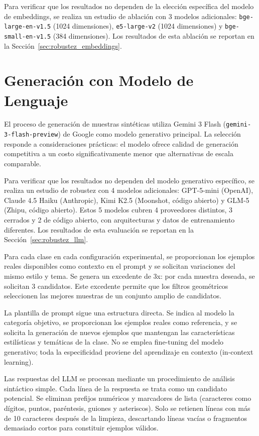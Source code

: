 Para verificar que los resultados no dependen de la elección específica del modelo de embeddings, se realiza un estudio de ablación con 3 modelos adicionales: \texttt{bge\hyp{}large\hyp{}en\hyp{}v1.5} (1024 dimensiones), \texttt{e5\hyp{}large\hyp{}v2} (1024 dimensiones) y \texttt{bge\hyp{}small\hyp{}en\hyp{}v1.5} (384 dimensiones). Los resultados de esta ablación se reportan en la Sección~\ref{sec:robustez_embeddings}.

\section{Generación con Modelo de Lenguaje}
\label{sec:generacion_llm}

El proceso de generación de muestras sintéticas utiliza Gemini 3 Flash (\texttt{gemini\hyp{}3\hyp{}flash\hyp{}preview}) de Google como modelo generativo principal. La selección responde a consideraciones prácticas: el modelo ofrece calidad de generación competitiva a un costo significativamente menor que alternativas de escala comparable.

Para verificar que los resultados no dependen del modelo generativo específico, se realiza un estudio de robustez con 4 modelos adicionales: GPT-5-mini (OpenAI), Claude 4.5 Haiku (Anthropic), Kimi K2.5 (Moonshot, código abierto) y GLM-5 (Zhipu, código abierto). Estos 5 modelos cubren 4 proveedores distintos, 3 cerrados y 2 de código abierto, con arquitecturas y datos de entrenamiento diferentes. Los resultados de esta evaluación se reportan en la Sección~\ref{sec:robustez_llm}.

Para cada clase en cada configuración experimental, se proporcionan los ejemplos reales disponibles como contexto en el prompt y se solicitan variaciones del mismo estilo y tema. Se genera un excedente de 3x: por cada muestra deseada, se solicitan 3 candidatos. Este excedente permite que los filtros geométricos seleccionen las mejores muestras de un conjunto amplio de candidatos.

La plantilla de prompt sigue una estructura directa. Se indica al modelo la categoría objetivo, se proporcionan los ejemplos reales como referencia, y se solicita la generación de nuevos ejemplos que mantengan las características estilísticas y temáticas de la clase. No se emplea fine-tuning del modelo generativo; toda la especificidad proviene del aprendizaje en contexto (in-context learning).

Las respuestas del LLM se procesan mediante un procedimiento de análisis sintáctico simple. Cada línea de la respuesta se trata como un candidato potencial. Se eliminan prefijos numéricos y marcadores de lista (caracteres como dígitos, puntos, paréntesis, guiones y asteriscos). Solo se retienen líneas con más de 10 caracteres después de la limpieza, descartando líneas vacías o fragmentos demasiado cortos para constituir ejemplos válidos.

